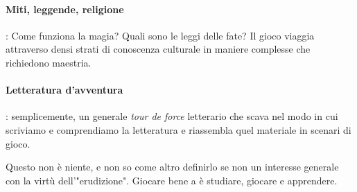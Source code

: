 \paragraph{Miti, leggende, religione}: Come funziona la magia? Quali sono le leggi delle fate? Il gioco viaggia attraverso densi strati di conoscenza culturale in maniere complesse che richiedono maestria.

\paragraph{Letteratura d'avventura}: semplicemente, un generale \textit{tour de force} letterario che scava nel modo in cui scriviamo e comprendiamo la letteratura e riassembla quel materiale in scenari di gioco.

Questo non è niente, e non so come altro definirlo se non un interesse generale con la virtù dell'"erudizione". Giocare bene a \dnd{} è studiare, giocare e apprendere.